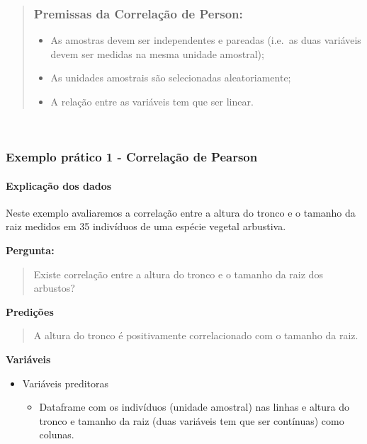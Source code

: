 \documentclass[
]{book}
\providecommand{\tightlist}{%
  \setlength{\itemsep}{0pt}\setlength{\parskip}{0pt}}
\begin{document}
\begin{quote}
\hypertarget{premissas-da-correlauxe7uxe3o-de-person}{%
\subsubsection{Premissas da Correlação de Person:}\label{premissas-da-correlauxe7uxe3o-de-person}}

\begin{itemize}
\tightlist
\item
  As amostras devem ser independentes e pareadas (i.e.~as duas variáveis devem ser medidas na mesma unidade amostral);
\item
  As unidades amostrais são selecionadas aleatoriamente;
\item
  A relação entre as variáveis tem que ser linear.
\end{itemize}
\end{quote}

~

\hypertarget{exemplo-pruxe1tico-1---correlauxe7uxe3o-de-pearson}{%
\subsubsection{Exemplo prático 1 - Correlação de Pearson}\label{exemplo-pruxe1tico-1---correlauxe7uxe3o-de-pearson}}

\hypertarget{explicauxe7uxe3o-dos-dados-3}{%
\paragraph{Explicação dos dados}\label{explicauxe7uxe3o-dos-dados-3}}

Neste exemplo avaliaremos a correlação entre a altura do tronco e o tamanho da raiz medidos em 35 indivíduos de uma espécie vegetal arbustiva.

\textbf{Pergunta:}

\begin{quote}
Existe correlação entre a altura do tronco e o tamanho da raiz dos arbustos?
\end{quote}

\textbf{Predições}

\begin{quote}
A altura do tronco é positivamente correlacionado com o tamanho da raiz.
\end{quote}

\textbf{Variáveis}

\begin{itemize}
\tightlist
\item
  Variáveis preditoras

  \begin{itemize}
  \tightlist
  \item
    Dataframe com os indivíduos (unidade amostral) nas linhas e altura do tronco e tamanho da raiz (duas variáveis tem que ser contínuas) como colunas.
  \end{itemize}
\end{itemize}
\end{document}

